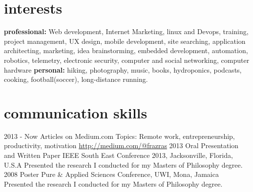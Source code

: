 \documentclass[]{friggeri-cv} %
\begin{document}

\section{interests}

\textbf{professional:} Web development, Internet Marketing, linux and Devops, training, project management, UX design, mobile development, site searching, application architecting, marketing, idea brainstorming, embedded development, automation, robotics, telemetry, electronic security, computer and social networking, computer hardware
\textbf{personal:} hiking, photography, music, books, hydroponics, podcasts, cooking, football(soccer), long-distance running.




\newpage
\section{communication skills}

\begin{entrylist}

\entry
{2013 - Now}
{Articles on Medium.com}
{Topics: Remote work, entrepreneurship, productivity, motivation}
{\href{http://medium.com/@frazras}{http://medium.com/@frazras}}
\entry
{2013}
{Oral Presentation and Written Paper}
{IEEE South East Conference 2013, Jacksonville, Florida, U.S.A}
{Presented the research I conducted for my Masters of Philosophy degree.}
\entry
{2008}
{Poster}
{Pure \& Applied Sciences Conference, UWI, Mona, Jamaica}
{Presented the research I conducted for my Masters of Philosophy degree.}
\end{entrylist}
\end{document}

